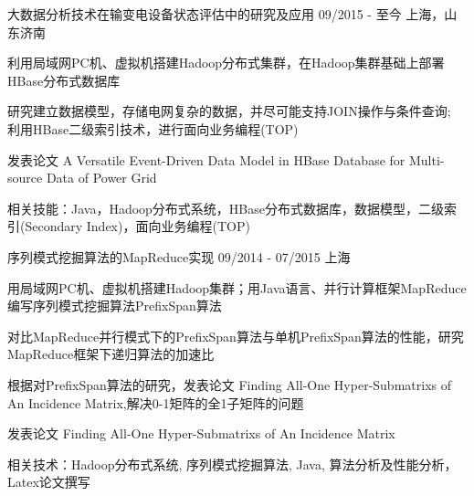 \begin{cventries}
 \vspace{5pt}
  \cventry
    {} %
    {大数据分析技术在输变电设备状态评估中的研究及应用} %
     {09/2015 - 至今} %
    {上海，山东济南} %
    {
    \vspace{-8pt}
      \begin{cvitems} %
        \item {利用局域网PC机、虚拟机搭建Hadoop分布式集群，在Hadoop集群基础上部署HBase分布式数据库}
        \item {研究建立数据模型，存储电网复杂的数据，并尽可能支持JOIN操作与条件查询; 利用HBase二级索引技术，进行面向业务编程(TOP)}
        \item{发表论文 A Versatile Event-Driven Data Model in HBase Database for Multi-source Data of Power Grid}
        \item{相关技能：Java，Hadoop分布式系统，HBase分布式数据库，数据模型，二级索引(Secondary Index)，面向业务编程(TOP) }
      \end{cvitems}
    }
    
    \vspace{5pt}
    \cventry
    {} %
    {序列模式挖掘算法的MapReduce实现} %
    {09/2014 - 07/2015} %
    {上海} %
    {
    \vspace{-8pt}
      \begin{cvitems} %
        \item {用局域网PC机、虚拟机搭建Hadoop集群；用Java语言、并行计算框架MapReduce编写序列模式挖掘算法PrefixSpan算法}
        \item {对比MapReduce并行模式下的PrefixSpan算法与单机PrefixSpan算法的性能，研究MapReduce框架下递归算法的加速比}
        \item{根据对PrefixSpan算法的研究，发表论文 Finding All-One Hyper-Submatrixs of An Incidence Matrix,解决0-1矩阵的全1子矩阵的问题 }
	\item{发表论文 Finding All-One Hyper-Submatrixs of An Incidence Matrix}
        \item{相关技术：Hadoop分布式系统, 序列模式挖掘算法, Java, 算法分析及性能分析，Latex论文撰写}
      \end{cvitems}
    }


\end{cventries}
